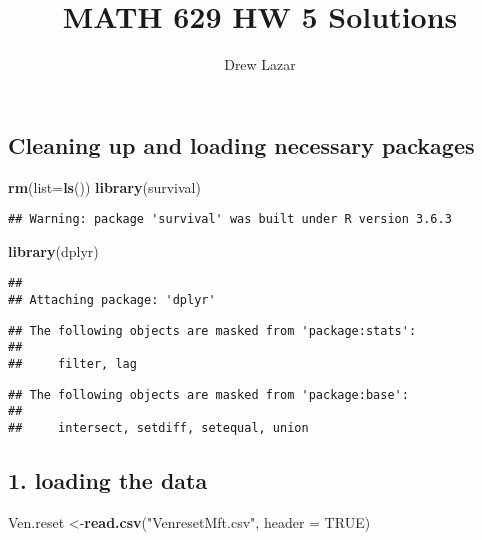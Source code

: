 \documentclass[]{article}
\title{MATH 629 HW 5 Solutions}
\author{Drew Lazar}
\date{}
\newenvironment{Shaded}{\begin{snugshade}}{\end{snugshade}}
\newcommand{\DataTypeTok}[1]{\textcolor[rgb]{0.13,0.29,0.53}{#1}}
\newcommand{\KeywordTok}[1]{\textcolor[rgb]{0.13,0.29,0.53}{\textbf{#1}}}
\newcommand{\NormalTok}[1]{#1}
\newcommand{\OtherTok}[1]{\textcolor[rgb]{0.56,0.35,0.01}{#1}}
\newcommand{\StringTok}[1]{\textcolor[rgb]{0.31,0.60,0.02}{#1}}
\begin{document}
\maketitle

\hypertarget{cleaning-up-and-loading-necessary-packages}{%
\subsection{Cleaning up and loading necessary
packages}\label{cleaning-up-and-loading-necessary-packages}}

\begin{Shaded}
\begin{Highlighting}[]
\KeywordTok{rm}\NormalTok{(}\DataTypeTok{list=}\KeywordTok{ls}\NormalTok{())}
\KeywordTok{library}\NormalTok{(survival)}
\end{Highlighting}
\end{Shaded}

\begin{verbatim}
## Warning: package 'survival' was built under R version 3.6.3
\end{verbatim}

\begin{Shaded}
\begin{Highlighting}[]
\KeywordTok{library}\NormalTok{(dplyr)}
\end{Highlighting}
\end{Shaded}

\begin{verbatim}
## 
## Attaching package: 'dplyr'
\end{verbatim}

\begin{verbatim}
## The following objects are masked from 'package:stats':
## 
##     filter, lag
\end{verbatim}

\begin{verbatim}
## The following objects are masked from 'package:base':
## 
##     intersect, setdiff, setequal, union
\end{verbatim}

\hypertarget{loading-the-data}{%
\subsection{1. loading the data}\label{loading-the-data}}

\begin{Shaded}
\begin{Highlighting}[]
\NormalTok{Ven.reset <-}\KeywordTok{read.csv}\NormalTok{(}\StringTok{"VenresetMft.csv"}\NormalTok{, }\DataTypeTok{header =} \OtherTok{TRUE}\NormalTok{)}
\end{Highlighting}
\end{Shaded}
\end{document}
